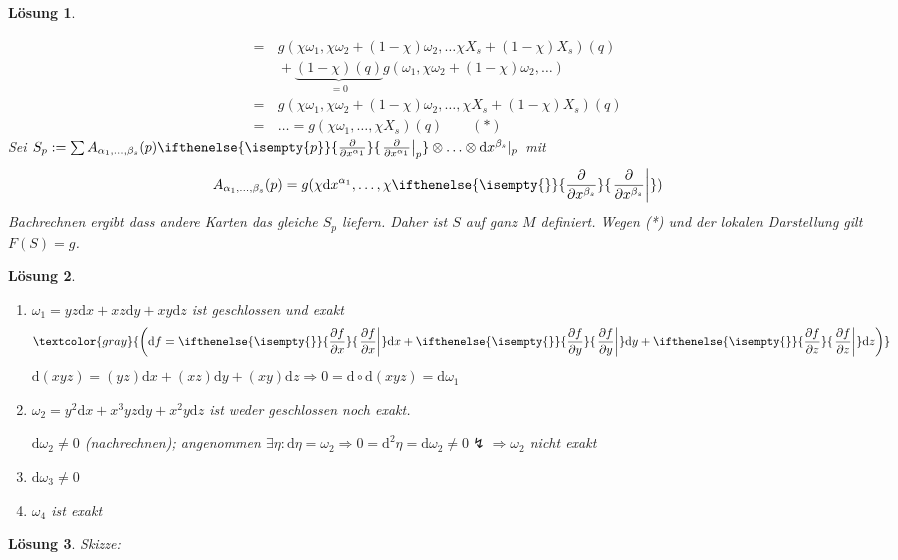 \documentclass[paper=A4, twoside, chapterprefix=true, bibliography=totoc, headsepline]{scrbook}
\newcommand{\dop}{\mathrm{d}}
\newcommand{\pdifffrac}[3][]{\ifthenelse{\isempty{#1}}{\frac{\partial #2}{\partial #3}}{\left. \frac{\partial #2}{\partial #3} \right|_{#1}}}
\theoremstyle{plain}
\theoremstyle{nonumberplain}
\theoremstyle{empty}
\theoremstyle{break}
\newtheorem{Loes}{L\"osung}
\begin{document}
\begin{Loes}
\begin{description}[leftmargin=*]
\begin{align*}
		={}&\, g(\chi \omega_1, \chi \omega_2 + (1 - \chi) \omega_2, \ldots \chi X_s + (1-\chi) X_s)(q)\\
		 &\, + \underbrace{(1-\chi)(q)}_{=0} g(\omega_1, \chi \omega_2 + (1-\chi) \omega_2,\ldots )\\
		={}&\, g(\chi\omega_1, \chi\omega_2 + (1-\chi)\omega_2,\ldots ,\chi X_s+ (1-\chi) X_s)(q)\\
		={}&\, \ldots = g(\chi \omega_1, \ldots ,\chi X_s)(q) \qquad (*)
	\end{align*}
	Sei $S_p := \sum A_{\alpha_1, \ldots, \beta_s}(p) \pdifffrac[p]{}{x^{\alpha_1}} \otimes \ldots \otimes \dop x^{\beta_s}|_p$ mit
		\[ A_{\alpha_1, \ldots, \beta_s}(p) = g(\chi \dop x^{\alpha_1},\ldots ,\chi \pdifffrac{}{x^{\beta_s}}) \]
	Bachrechnen ergibt dass andere Karten das gleiche $S_p$ liefern. Daher ist $S$ auf ganz $M$ definiert. Wegen (*) und der lokalen Darstellung gilt $F(S) = g$.
\end{description}
\end{Loes}

\begin{Loes}\begin{enumerate}[label=\alph*), leftmargin=*]
\item
	$\omega_1 = yz \dop x + xz \dop y + xy \dop z$ ist geschlossen und exakt
		\[ \textcolor{gray}{\left(\dop f = \pdifffrac{f}{x} \dop x + \pdifffrac{f}{y} \dop y + \pdifffrac{f}{z} \dop z \right)} \]
	$\dop(xyz) = (yz) \dop x + (xz) \dop y + (xy) \dop z \Rightarrow 0 = \dop \circ \dop(xyz) = \dop \omega_1$
\item
	$\omega_2 = y^2 \dop x + x^3yz \dop y + x^2y \dop z$ ist weder geschlossen noch exakt.
	
	$\dop \omega_2 \ne 0$ (nachrechnen); angenommen $\exists \eta : \dop \eta = \omega_2 \Rightarrow 0 = \dop^2 \eta = \dop \omega_2 \ne 0 \lightning \Rightarrow \omega_2$ nicht exakt
\item
	$\dop \omega_3 \ne 0$
\item
	$\omega_4$ ist exakt
\end{enumerate}\end{Loes}

\begin{Loes}
Skizze:
\begin{center}\end{center}
\end{Loes}
\end{document}
